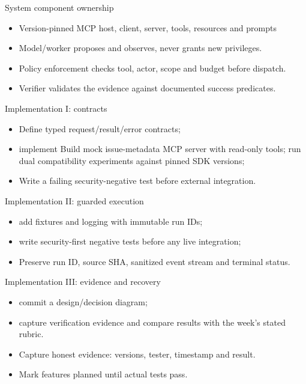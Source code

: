 \documentclass[aspectratio=169,10pt]{beamer}
\begin{document}
\begin{frame}{System component ownership}
\small
\begin{itemize}
\item Version-pinned MCP host, client, server, tools, resources and prompts
\item Model/worker proposes and observes, never grants new privileges.
\item Policy enforcement checks tool, actor, scope and budget before dispatch.
\item Verifier validates the evidence against documented success predicates.
\end{itemize}

\end{frame}

\begin{frame}{Implementation I: contracts}
\small
\begin{itemize}
\item Define typed request/result/error contracts;
\item implement Build mock issue-metadata MCP server with read-only tools; run dual compatibility experiments against pinned SDK versions;
\item Write a failing security-negative test before external integration.
\end{itemize}

\end{frame}

\begin{frame}{Implementation II: guarded execution}
\small
\begin{itemize}
\item add fixtures and logging with immutable run IDs;
\item write security-first negative tests before any live integration;
\item Preserve run ID, source SHA, sanitized event stream and terminal status.
\end{itemize}

\end{frame}

\begin{frame}{Implementation III: evidence and recovery}
\small
\begin{itemize}
\item commit a design/decision diagram;
\item capture verification evidence and compare results with the week's stated rubric.
\item Capture honest evidence: versions, tester, timestamp and result.
\item Mark features planned until actual tests pass.
\end{itemize}

\end{frame}
\end{document}
